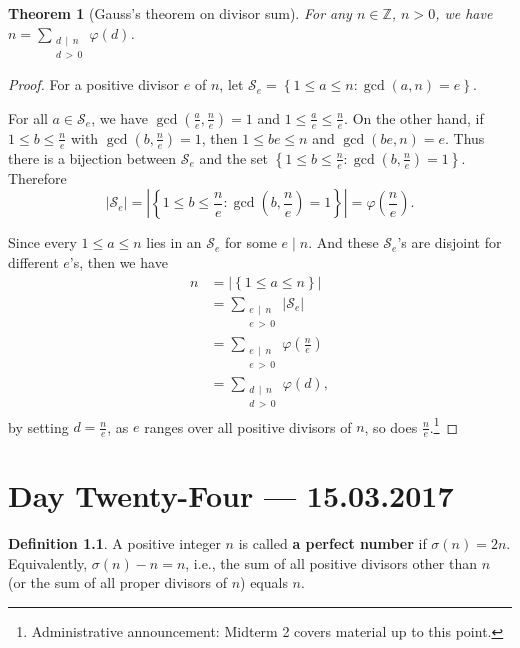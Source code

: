 \documentclass{amsbook}
\theoremstyle{plain}
\newtheorem{theorem}{Theorem}[chapter] %
\theoremstyle{definition}
\newtheorem{definition}[theorem]{Definition}
\theoremstyle{remark}
\numberwithin{equation}{chapter}
\numberwithin{figure}{chapter}
\newcommand{\Z}{\mathbb{Z}}
\newcommand{\sS}{\mathcal{S}}
\begin{document}
\begin{theorem}[Gauss's theorem on divisor sum]\label{thm:gauss_id}
  For any $n \in \Z$, $n > 0$, we have $n = \sum_{\substack{d\, \mid \, n \\ d \, > \, 0}} \varphi (d)$.
\end{theorem}
\begin{proof}
  For a positive divisor $e$ of $n$, let $\sS_e = \left\{ 1 \leqslant a \leqslant n : \gcd (a, n) = e \right\}$. 

For all $a \in \sS_e$, we have $\gcd (\frac{a}e, \frac{n}e) = 1$ and $1 \leqslant \frac{a}e \leqslant \frac{n}e$. On the other hand, if $1 \leqslant b \leqslant \frac{n}e$ with $\gcd (b, \frac{n}e) = 1$, then $1 \leqslant be \leqslant n$ and $\gcd (be, n) = e$. Thus there is a bijection between $\sS_e$ and the set $\left\{ 1 \leqslant b \leqslant \frac{n}e : \gcd (b, \frac{n}e) = 1 \right\}$. Therefore 
\[
| \sS_e | = \left| \left\{ 1 \leqslant b \leqslant \frac{n}e : \gcd (b, \frac{n}e) = 1 \right\} \right| = \varphi \left(\frac{n}e \right).
\]

Since every $1 \leqslant a \leqslant n$ lies in an $\sS_e$ for some $e \mid n$. And these $\sS_e$'s are disjoint for different $e$'s, then we have 
\begin{align} 
  n &= \left| \left\{ 1 \leqslant a \leqslant n \right\} \right| \\
    &= \sum_{\substack{e\, \mid \, n \\ e \, > \, 0}} \left| \sS_e \right | \\
    &= \sum_{\substack{e\, \mid \, n \\ e \, > \, 0}} \varphi \left( \frac{n}e \right) \\
    &= \sum_{\substack{d\, \mid \, n \\ d \, > \, 0}} \varphi (d),
\end{align}
by setting $d = \frac{n}e$, as $e$ ranges over all positive divisors of $n$, so does $\frac{n}e$.\footnote{Administrative announcement: Midterm 2 covers material up to this point.}
\end{proof}

\chapter[Lecture Twenty-Four]{Day Twenty-Four \hfill {\footnotesize \rm --- 15.03.2017}}

\begin{definition}
A positive integer $n$ is called \textbf{a perfect number} if $\sigma (n) = 2n$. Equivalently, $\sigma (n) - n = n$, i.e., the sum of all positive divisors other than $n$ (or the sum of all proper divisors of $n$) equals $n$.
\end{definition}
\end{document}

